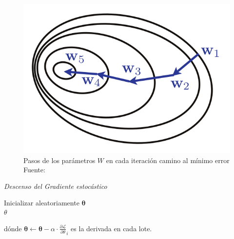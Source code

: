         \begin{figure}[H]
            \centering
            \includegraphics[scale=0.3]{imagenes/sgd}
            \caption{Pasos de los parámetros $W$ en cada iteración camino al mínimo error\\ Fuente: \citep{10.5555/3360093}}
        \end{figure}
        {
        \begin{algorithm}[H]
        	\caption{\textit{Descenso del Gradiente estocástico}}
        	\SetAlgoLined
        	Inicializar aleatoriamente $\mathbf{\theta}$\\
        	\Return $\theta$
        \end{algorithm}
        }
        
        \noindent dónde $\mathbf{\theta} \leftarrow \mathbf{\theta} - \alpha\cdot \frac{\partial\mathcal{L}}{\partial \theta}_i$ es la derivada en cada lote.
    
